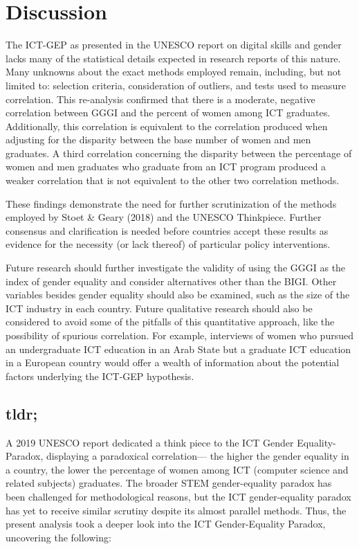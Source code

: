\documentclass[]{book}
\begin{document}
\chapter{Discussion}\label{discussion}

The ICT-GEP as presented in the UNESCO report on digital skills and
gender lacks many of the statistical details expected in research
reports of this nature. Many unknowns about the exact methods employed
remain, including, but not limited to: selection criteria, consideration
of outliers, and tests used to measure correlation. This re-analysis
confirmed that there is a moderate, negative correlation between GGGI
and the percent of women among ICT graduates. Additionally, this
correlation is equivalent to the correlation produced when adjusting for
the disparity between the base number of women and men graduates. A
third correlation concerning the disparity between the percentage of
women and men graduates who graduate from an ICT program produced a
weaker correlation that is not equivalent to the other two correlation
methods.

These findings demonstrate the need for further scrutinization of the
methods employed by Stoet \& Geary (2018) and the UNESCO Thinkpiece.
Further consensus and clarification is needed before countries accept
these results as evidence for the necessity (or lack thereof) of
particular policy interventions.

Future research should further investigate the validity of using the
GGGI as the index of gender equality and consider alternatives other
than the BIGI. Other variables besides gender equality should also be
examined, such as the size of the ICT industry in each country. Future
qualitative research should also be considered to avoid some of the
pitfalls of this quantitative approach, like the possibility of spurious
correlation. For example, interviews of women who pursued an
undergraduate ICT education in an Arab State but a graduate ICT
education in a European country would offer a wealth of information
about the potential factors underlying the ICT-GEP hypothesis.

\section{tldr;}\label{tldr}

A 2019 UNESCO report \citep{westBlushIfCould2019a} dedicated a think
piece to the ICT Gender Equality-Paradox, displaying a paradoxical
correlation--- the higher the gender equality in a country, the lower
the percentage of women among ICT (computer science and related
subjects) graduates. The broader STEM gender-equality paradox has been
challenged \citep{richardsonThereGenderEqualityParadox2020a} for
methodological reasons, but the ICT gender-equality paradox has yet to
receive similar scrutiny despite its almost parallel methods. Thus, the
present analysis took a deeper look into the ICT Gender-Equality
Paradox, uncovering the following:
\end{document}
